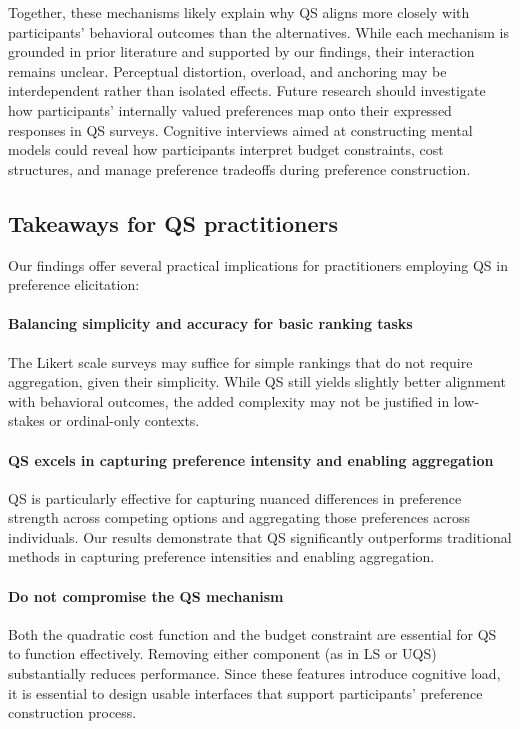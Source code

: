 Together, these mechanisms likely explain why QS aligns more closely with participants' behavioral outcomes than the alternatives. While each mechanism is grounded in prior literature and supported by our findings, their interaction remains unclear. Perceptual distortion, overload, and anchoring may be interdependent rather than isolated effects. Future research should investigate how participants' internally valued preferences map onto their expressed responses in QS surveys. Cognitive interviews aimed at constructing mental models could reveal how participants interpret budget constraints, cost structures, and manage preference tradeoffs during preference construction.

\subsection{Takeaways for QS practitioners}
Our findings offer several practical implications for practitioners employing QS in preference elicitation:

\paragraph{Balancing simplicity and accuracy for basic ranking tasks}
The Likert scale surveys may suffice for simple rankings that do not require aggregation, given their simplicity. While QS still yields slightly better alignment with behavioral outcomes, the added complexity may not be justified in low-stakes or ordinal-only contexts.

\paragraph{QS excels in capturing preference intensity and enabling aggregation}
QS is particularly effective for capturing nuanced differences in preference strength across competing options and aggregating those preferences across individuals. Our results demonstrate that QS significantly outperforms traditional methods in capturing preference intensities and enabling aggregation.

\paragraph{Do not compromise the QS mechanism}
Both the quadratic cost function and the budget constraint are essential for QS to function effectively. Removing either component (as in LS or UQS) substantially reduces performance. Since these features introduce cognitive load, it is essential to design usable interfaces that support participants' preference construction process.

